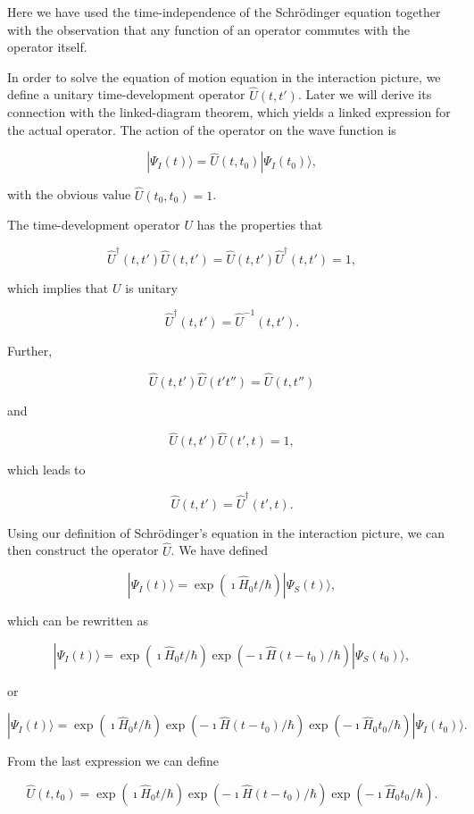 Here we have used the time-independence of the Schrödinger equation
together with the observation that any function of an operator commutes with the operator itself. 



In order to solve the equation of motion equation in the interaction picture, we define a unitary
time-development operator $\hat{U}(t,t')$. Later we will derive its
connection with the linked-diagram theorem, which yields a
linked expression for the actual operator. 
The action of the operator on the wave function is

\[
|\Psi_I(t) \rangle = \hat{U}(t,t_0)|\Psi_I(t_0)\rangle,
\]

with the obvious value $\hat{U}(t_0,t_0)=1$.



The time-development operator $U$ has the
properties that

\[
     \hat{U}^{\dagger}(t,t')\hat{U}(t,t')=\hat{U}(t,t')\hat{U}^{\dagger}(t,t')=1,
\]

which implies that $U$ is unitary

\[
     \hat{U}^{\dagger}(t,t')=\hat{U}^{-1}(t,t').
\]

Further,

\[
    \hat{U}(t,t')\hat{U}(t't'')=\hat{U}(t,t'')
\]

and

\[
    \hat{U}(t,t')\hat{U}(t',t)=1,
\]

which leads to

\[
    \hat{U}(t,t')=\hat{U}^{\dagger}(t',t).
\]



Using our definition of Schrödinger's equation in the interaction picture, we can then construct the operator $\hat{U}$. We have defined

\[
|\Psi_I(t)\rangle = \exp{(\imath\hat{H}_0t/\hbar)}|\Psi_S(t)\rangle,
\]

which can be rewritten as 

\[
|\Psi_I(t)\rangle = \exp{(\imath\hat{H}_0t/\hbar)}\exp{(-\imath\hat{H}(t-t_0)/\hbar)}|\Psi_S(t_0)\rangle,
\]

or

\[
|\Psi_I(t)\rangle = \exp{(\imath\hat{H}_0t/\hbar)}\exp{(-\imath\hat{H}(t-t_0)/\hbar)}\exp{(-\imath\hat{H}_0t_0/\hbar)}|\Psi_I(t_0)\rangle.
\]



From the last expression we can define

\[
\hat{U}(t,t_0)=\exp{(\imath\hat{H}_0t/\hbar)}\exp{(-\imath\hat{H}(t-t_0)/\hbar)}\exp{(-\imath\hat{H}_0t_0/\hbar)}.
\]

